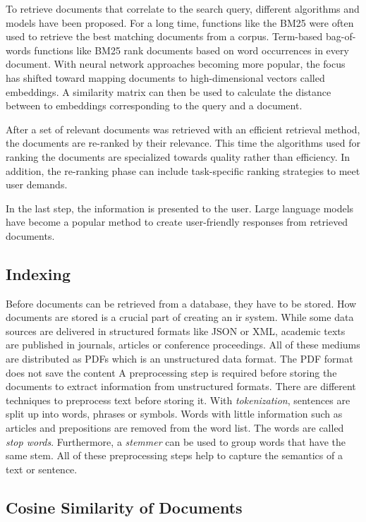 \documentclass[../main.tex]{subfiles}
\begin{document}
To retrieve documents that correlate to the search query,
different algorithms and models have been proposed.
For a long time, functions like the BM25 \cite{Robertson2009}
were often used to retrieve the best matching documents from a corpus.
Term-based bag-of-words functions like BM25 rank documents based on word occurrences in every document.
With neural network approaches becoming more popular,
the focus has shifted toward mapping documents to high-dimensional vectors called embeddings.
A similarity matrix can then be used to calculate the distance between to embeddings corresponding to the query and a document.

After a set of relevant documents was retrieved with an efficient retrieval method,
the documents are re-ranked by their relevance.
This time the algorithms used for ranking the documents are specialized towards quality rather than efficiency.
In addition, the re-ranking phase can include task-specific ranking strategies to meet user demands.

In the last step, the information is presented to the user.
Large language models have become a popular method to create user-friendly responses from retrieved documents.

\subsection{Indexing}

Before documents can be retrieved from a database,
they have to be stored.
How documents are stored is a crucial part of creating an \gls{ir} system.
While some data sources are delivered in structured formats like JSON or XML,
academic texts are published in journals, articles or conference proceedings.
All of these mediums are distributed as PDFs which is an unstructured data format.
The PDF format does not save the content
A preprocessing step is required before storing the documents to extract information from unstructured formats.
There are different techniques to preprocess text before storing it.
With \emph{tokenization}, sentences are split up into words, phrases or symbols.
Words with little information such as articles and prepositions are removed from the word list.
The words are called \emph{stop words}.
Furthermore, a \emph{stemmer} can be used to group words that have the same stem.
All of these preprocessing steps help to capture the semantics of a text or sentence.

\subsection{Cosine Similarity of Documents}
\end{document}
